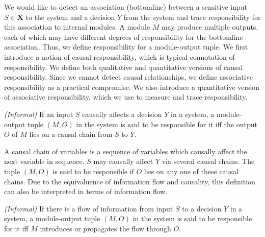\documentclass[10pt, onecolumn]{report}
\begin{document}

We would like to detect an association (bottomline) 
between a sensitive input $S \in \mathbf{X}$ 
to the system and a decision $Y$ from the system 
and trace responsibility for this association to internal modules. A module $M$
may produce multiple outputs, each of which may have different degrees of
responsibility for the bottomline association. Thus, we define responsibility for
a module-output tuple. We first introduce a notion of causal responsibility, which
is typical connotation of responsibility. We define both qualitative and quantitative
versions of causal responsibility. Since we cannot detect causal relationships, 
we define associative responsibility as a practical compromise. 
We also introduce a quantitative version of associative responsibility, 
which we use to measure and trace responsibility. 

\begin{definition}\label{def:CR} \emph{(Informal)}
If an input $S$ causally affects a decision $Y$ in a system, 
a module-output tuple $(M, O)$ in the system is said to be responsible for it 
iff the output $O$ of $M$ lies on a causal chain from $S$ to $Y$.
\end{definition}

A causal chain of variables is a sequence of variables which causally affect
the next variable in sequence. $S$ may causally affect $Y$ via several 
causal chains. The tuple $(M, O)$ is said to be responsible if $O$ lies on 
any one of these causal chains. Due to the equivaluence of information flow
and causality, this definition can also be interpreted in terms of information
flow. 
\begin{definition}\label{def:CRinfo}\emph{(Informal)}
If there is a flow of information from input $S$ to a decision $Y$ in a system, 
a module-output tuple $(M, O)$ in the system is said to be responsible for it 
iff $M$ introduces or propagates the flow through $O$.  
\end{definition}
\end{document}
